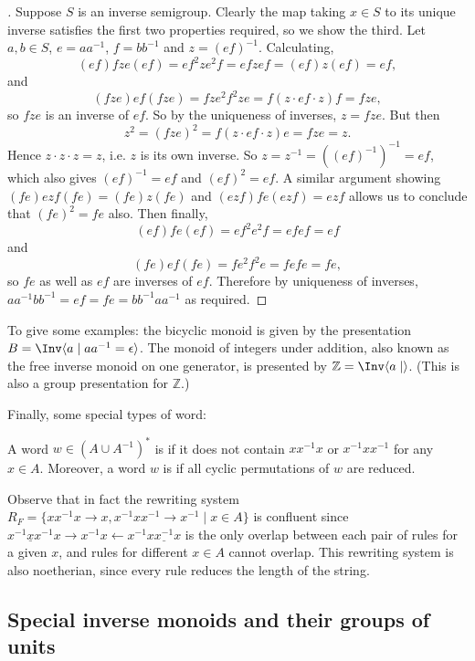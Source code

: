\documentclass[noindex,noinsetproof,12pt]{lmaths}
\begin{document}
\begin{proof}[ ]
	Suppose $S$ is an inverse semigroup. Clearly the map taking $x \in S$ to its unique inverse satisfies the first two properties required, so we show the third. Let $a, b \in S$, $e = aa^{-1}$, $f = bb^{-1}$ and $z = (ef)^{-1}$. Calculating,
	\[ (ef)fze(ef) = ef^2ze^2f = efzef = (ef)z(ef) = ef, \]
	and
	\[ (fze)ef(fze) = fze^2f^2ze = f(z\cdot ef\cdot z)f = fze, \]
	so $fze$ is an inverse of $ef$. So by the uniqueness of inverses, $z = fze$. But then
	\[ z^2 = (fze)^2 = f(z\cdot ef \cdot z)e = fze = z. \]
	Hence $z\cdot z\cdot z = z$, i.e. $z$ is its own inverse. So $z = z^{-1} = ((ef)^{-1})^{-1} = ef$, which also gives $(ef)^{-1} = ef$ and $(ef)^2 = ef$. A similar argument showing $(fe)ezf(fe) = (fe)z(fe)$ and $(ezf)fe(ezf) = ezf$ allows us to conclude that $(fe)^2 = fe$ also. Then finally,
	\[ (ef)fe(ef) = ef^2e^2f = efef = ef \]
	and
	\[ (fe)ef(fe) = fe^2f^2e = fefe = fe, \]
	so $fe$ as well as $ef$ are inverses of $ef$. Therefore by uniqueness of inverses, $aa^{-1}bb^{-1} = ef = fe = bb^{-1}aa^{-1}$ as required.
\end{proof}

To give some examples: the bicyclic monoid is given by the presentation $B = \Inv \langle a \mid aa^{-1} = \epsilon \rangle$. The monoid of integers under addition, also known as the free inverse monoid on one generator, is presented by $\mathbb{Z} = \Inv \langle a \mid \rangle$. (This is also a group presentation for $\mathbb{Z}$.)

Finally, some special types of word:

\begin{defn}
	A word $w \in (A \cup A^{-1})^*$ is  if it does not contain $xx^{-1}x$ or $x^{-1}xx^{-1}$ for any $x \in A$. Moreover, a word $w$ is  if all cyclic permutations of $w$ are reduced.
\end{defn}
	
Observe that in fact the rewriting system $R_F = \{ xx^{-1}x \to x, x^{-1}xx^{-1} \to x^{-1} \mid x \in A\}$ is confluent since $\underline{x^{-1}xx^{-1}}x \to x^{-1}x \leftarrow x^{-1}\underline{xx^{-1}x}$ is the only overlap between each pair of rules for a given $x$, and rules for different $x \in A$ cannot overlap. This rewriting system is also noetherian, since every rule reduces the length of the string.

\subsection{Special inverse monoids and their groups of units}
\end{document}
